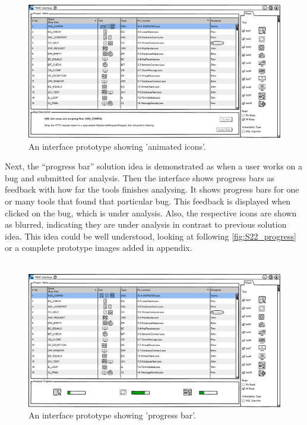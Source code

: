 \begin{figure}[hbt!]
	\centering
	\includegraphics[width=\linewidth]{figures/solution_ideas_snaps/S22_animation}
	\caption{An interface prototype showing 'animated icons'.}
	\label{fig:S22_animation}
\end{figure}


Next, the “progress bar” solution idea is demonstrated as when a user works on a bug and submitted for analysis. Then the interface shows progress bars as feedback with how far the tools finishes analysing. It shows progress bars for one or many tools that found that particular bug. This feedback is displayed when clicked on the bug, which is under analysis. Also, the respective icons are shown as blurred, indicating they are under analysis in contrast to previous solution idea. This idea could be well understood, looking at following \autoref{fig:S22_progress} or a complete prototype images added in appendix.  \\ \\


\begin{figure}[hbt!]
	\centering
	\includegraphics[width=\linewidth]{figures/solution_ideas_snaps/S22_progress}
	\caption{An interface prototype showing 'progress bar'.}
	\label{fig:S22_progress}
\end{figure}


